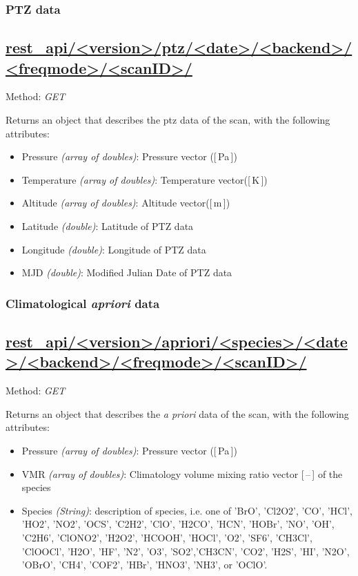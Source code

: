 


\subsubsection{PTZ data}
\subsection*{\url{rest_api/<version>/ptz/<date>/<backend>/<freqmode>/<scanID>/}}
Method: \emph{GET}

Returns an object that describes the ptz data of the scan,
with the following attributes:

\begin{itemize}
    \item Pressure \emph{(array of doubles)}: Pressure vector ([\,Pa\,])
    \item Temperature \emph{(array of doubles)}: Temperature vector([\,K\,])
    \item Altitude \emph{(array of doubles)}:  Altitude vector([\,m\,])
    \item Latitude \emph{(double)}: Latitude of PTZ data
    \item Longitude \emph{(double)}: Longitude of PTZ data
    \item MJD \emph{(double)}: Modified Julian Date of PTZ data

\end{itemize}

\subsubsection{Climatological \textit{apriori} data}
\subsection*{\url{rest_api/<version>/apriori/<species>/<date>/<backend>/<freqmode>/<scanID>/}}
Method: \emph{GET}

Returns an object that describes the \textit{a priori} data of the scan,
with the following attributes:

\begin{itemize}
    \item Pressure \emph{(array of doubles)}: Pressure vector ([\,Pa\,])
    \item VMR \emph{(array of doubles)}: Climatology volume mixing ratio vector [\,--\,] of the species
    \item Species \emph{(String)}: description of species, i.e. one of 'BrO', 'Cl2O2', 'CO',
          'HCl', 'HO2', 'NO2', 'OCS', 'C2H2', 'ClO', 'H2CO', 'HCN', 'HOBr', 'NO', 'OH', 'C2H6',
          'ClONO2', 'H2O2', 'HCOOH', 'HOCl', 'O2', 'SF6', 'CH3Cl', 'ClOOCl', 'H2O', 'HF', 'N2', 'O3',
          'SO2','CH3CN', 'CO2', 'H2S', 'HI', 'N2O', 'OBrO', 'CH4', 'COF2', 'HBr', 'HNO3', 'NH3', or 'OClO'.
\end{itemize}



